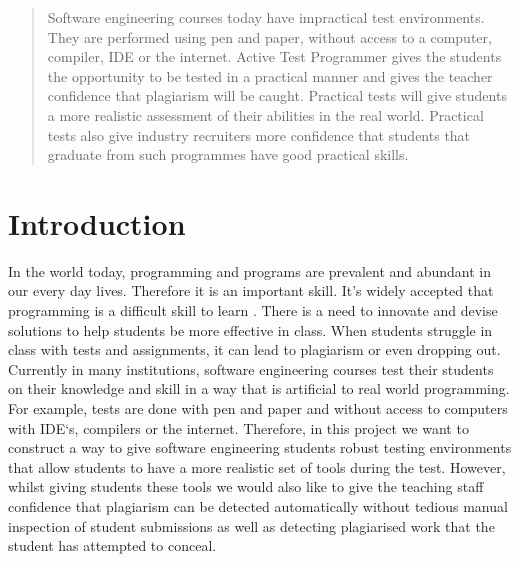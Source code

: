 \documentclass[a1,portrait]{a0poster}
\begin{document}
\begin{multicols}{2} %


\color{Navy} %

\begin{abstract}

Software engineering courses today have impractical test environments. They are
performed using pen and paper, without access to a computer, compiler, IDE or
the internet. Active Test Programmer gives the students the opportunity to be
tested in a practical manner and gives the teacher confidence that plagiarism
will be caught. Practical tests will give students a more realistic assessment
of their abilities in the real world. Practical tests also give industry
recruiters more confidence that students that graduate from such programmes have
good practical skills. 

\end{abstract}


\color{SaddleBrown} %

\section*{Introduction}

In the world today, programming and programs are prevalent and abundant in our
every day lives. Therefore it is an important skill. It's
widely accepted that programming is a difficult skill to learn
\cite{jenkins2002difficulty, robins2003learning}. There is a need to innovate
and devise solutions to help students be more effective in class.
When students struggle in class with tests and assignments, it can lead to
plagiarism or even dropping out\cite{bennedsen2007failure}. Currently in many
institutions, software engineering courses test their students on their
knowledge and skill in a way that is artificial to real world programming.
For example, tests are done with pen and paper and without access to computers with
IDE`s, compilers or the internet. Therefore, in this project we want to construct a
way to give software engineering students robust testing environments that allow
students to have a more realistic set of tools during the test. However, whilst
giving students these tools we would also like to give the teaching staff
confidence that plagiarism can be detected automatically without tedious manual
inspection of student submissions as well as detecting plagiarised work that the
student has attempted to conceal.


\end{multicols}
\end{document}
